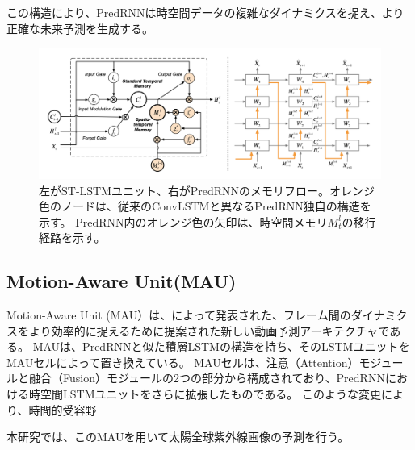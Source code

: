           この構造により、PredRNNは時空間データの複雑なダイナミクスを捉え、より正確な未来予測を生成する。
          \begin{figure}[htbp]
            \begin{center}
              \includegraphics[width=160mm]{figures/videoprediction/predrnn_unit.png}
              \caption{左がST-LSTMユニット、右がPredRNNのメモリフロー。オレンジ色のノードは、従来のConvLSTMと異なるPredRNN独自の構造を示す。
              PredRNN内のオレンジ色の矢印は、時空間メモリ\( M_t^l \)の移行経路を示す。}
              \label{fig:stlstm}
            \end{center}
          \end{figure}
        
    \subsection{Motion-Aware Unit(MAU)}
      Motion-Aware Unit (MAU）は、によって発表された、フレーム間のダイナミクスをより効率的に捉えるために提案された新しい動画予測アーキテクチャである。
      MAUは、PredRNNと似た積層LSTMの構造を持ち、そのLSTMユニットをMAUセルによって置き換えている。
      MAUセルは、注意（Attention）モジュールと融合（Fusion）モジュールの2つの部分から構成されており、PredRNNにおける時空間LSTMユニットをさらに拡張したものである。
      このような変更により、時間的受容野

      本研究では、このMAUを用いて太陽全球紫外線画像の予測を行う。
      
